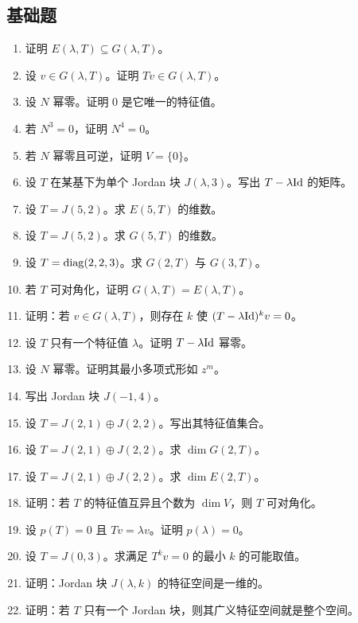 \subsection*{基础题}
\begin{enumerate}[label=\textbf{\arabic*.}, leftmargin=*, itemsep=0.5em]
\item \basic 证明 $E(\lambda,T)\subseteq G(\lambda,T)$。
\item \basic 设 $v\in G(\lambda,T)$。证明 $Tv\in G(\lambda,T)$。
\item \basic 设 $N$ 幂零。证明 $0$ 是它唯一的特征值。
\item \basic 若 $N^3=0$，证明 $N^4=0$。
\item \basic 若 $N$ 幂零且可逆，证明 $V=\{0\}$。
\item \basic 设 $T$ 在某基下为单个 Jordan 块 $J(\lambda,3)$。写出 $T-\lambda\mathrm{Id}$ 的矩阵。
\item \basic 设 $T=J(5,2)$。求 $E(5,T)$ 的维数。
\item \basic 设 $T=J(5,2)$。求 $G(5,T)$ 的维数。
\item \basic 设 $T=\mathrm{diag}(2,2,3)$。求 $G(2,T)$ 与 $G(3,T)$。
\item \basic 若 $T$ 可对角化，证明 $G(\lambda,T)=E(\lambda,T)$。
\item \basic 证明：若 $v\in G(\lambda,T)$，则存在 $k$ 使 $(T-\lambda\mathrm{Id})^kv=0$。
\item \basic 设 $T$ 只有一个特征值 $\lambda$。证明 $T-\lambda\mathrm{Id}$ 幂零。
\item \basic 设 $N$ 幂零。证明其最小多项式形如 $z^m$。
\item \basic 写出 Jordan 块 $J(-1,4)$。
\item \basic 设 $T=J(2,1)\oplus J(2,2)$。写出其特征值集合。
\item \basic 设 $T=J(2,1)\oplus J(2,2)$。求 $\dim G(2,T)$。
\item \basic 设 $T=J(2,1)\oplus J(2,2)$。求 $\dim E(2,T)$。
\item \basic 证明：若 $T$ 的特征值互异且个数为 $\dim V$，则 $T$ 可对角化。
\item \basic 设 $p(T)=0$ 且 $Tv=\lambda v$。证明 $p(\lambda)=0$。
\item \basic 设 $T=J(0,3)$。求满足 $T^kv=0$ 的最小 $k$ 的可能取值。
\item \basic 证明：Jordan 块 $J(\lambda,k)$ 的特征空间是一维的。
\item \basic 证明：若 $T$ 只有一个 Jordan 块，则其广义特征空间就是整个空间。
\end{enumerate}

